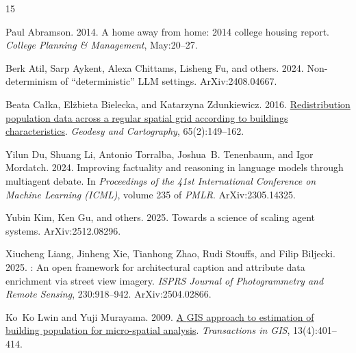 \documentclass[11pt]{article}
\begin{document}
\begin{thebibliography}{15}
\providecommand{\natexlab}[1]{#1}

Paul Abramson. 2014.
\newblock A home away from home: 2014 college housing report.
\newblock \emph{College Planning \& Management}, May:20--27.

Berk Atil, Sarp Aykent, Alexa Chittams, Lisheng Fu, and others. 2024.
\newblock Non-determinism of ``deterministic'' {LLM} settings.
\newblock ArXiv:2408.04667.

Beata Ca{\l}ka, El{\.z}bieta Bielecka, and Katarzyna Zdunkiewicz. 2016.
\newblock \href {https://doi.org/10.1515/geocart-2016-0011} {Redistribution
  population data across a regular spatial grid according to buildings
  characteristics}.
\newblock \emph{Geodesy and Cartography}, 65(2):149--162.

Yilun Du, Shuang Li, Antonio Torralba, Joshua~B. Tenenbaum, and Igor Mordatch.
  2024.
\newblock Improving factuality and reasoning in language models through
  multiagent debate.
\newblock In \emph{Proceedings of the 41st International Conference on Machine
  Learning (ICML)}, volume 235 of \emph{PMLR}.
\newblock ArXiv:2305.14325.

Yubin Kim, Ken Gu, and others. 2025.
\newblock Towards a science of scaling agent systems.
\newblock ArXiv:2512.08296.

Xiucheng Liang, Jinheng Xie, Tianhong Zhao, Rudi Stouffs, and Filip Biljecki.
  2025.
: An open framework for architectural caption and
  attribute data enrichment via street view imagery.
\newblock \emph{ISPRS Journal of Photogrammetry and Remote Sensing},
  230:918--942.
\newblock ArXiv:2504.02866.

Ko~Ko Lwin and Yuji Murayama. 2009.
\newblock \href {https://doi.org/10.1111/j.1467-9671.2009.01171.x} {A {GIS}
  approach to estimation of building population for micro-spatial analysis}.
\newblock \emph{Transactions in GIS}, 13(4):401--414.


\end{thebibliography}
\end{document}
